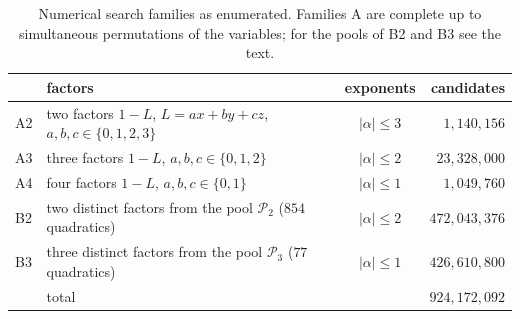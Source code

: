 \documentclass[11pt]{amsart}
\theoremstyle{definition}
\theoremstyle{remark}
\numberwithin{equation}{section}
\begin{document}
\begin{table}[ht]
\centering
\small
\begin{tabular}{llcr}
\toprule
& factors & exponents & candidates\\
\midrule
A2 & two factors $1-L$, $L=ax+by+cz$, $a,b,c\in\{0,1,2,3\}$ & $|\alpha|\le3$ & $1{,}140{,}156$\\
A3 & three factors $1-L$, $a,b,c\in\{0,1,2\}$ & $|\alpha|\le2$ & $23{,}328{,}000$\\
A4 & four factors $1-L$, $a,b,c\in\{0,1\}$ & $|\alpha|\le1$ & $1{,}049{,}760$\\
B2 & two distinct factors from the pool $\mathcal P_2$ ($854$ quadratics) & $|\alpha|\le2$ & $472{,}043{,}376$\\
B3 & three distinct factors from the pool $\mathcal P_3$ ($77$ quadratics) & $|\alpha|\le1$ & $426{,}610{,}800$\\
\midrule
& total & & $924{,}172{,}092$\\
\bottomrule
\end{tabular}
\medskip
\caption{Numerical search families as enumerated. Families A are complete up to simultaneous permutations of the variables; for the pools of B2 and B3 see the text.}\label{tab:search}
\end{table}
\end{document}
